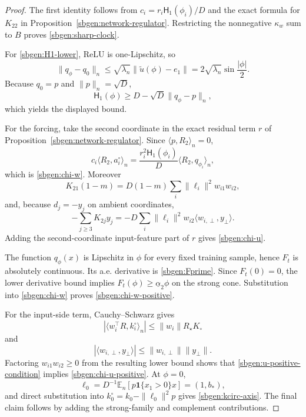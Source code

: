 \documentclass{article} %
\theoremstyle{plain}
\theoremstyle{definition}
\theoremstyle{remark}
\begin{document}
\begin{proof}
The first identity follows from
$c_i=r_i\mathsf H_1(\phi_i)/D$ and the exact formula for $K_{22}$ in
Proposition~\ref{sbgen:network-regulator}.  Restricting the nonnegative
$\kappa_w$ sum to $B$ proves \eqref{sbgen:sharp-clock}.

For \eqref{sbgen:H1-lower}, ReLU is one-Lipschitz, so
\[
\|q_\phi-q_0\|_n
\le
\sqrt{\lambda_n}\|\widetilde u(\phi)-e_1\|
=
2\sqrt{\lambda_n}\sin\frac{|\phi|}{2}.
\]
Because $q_0=p$ and $\|p\|_n=\sqrt D$,
\[
\mathsf H_1(\phi)
\ge
D-\sqrt D\|q_\phi-p\|_n,
\]
which yields the displayed bound.

For the forcing, take the second coordinate in the exact residual term $r$
of Proposition~\ref{sbgen:network-regulator}.  Since
$\langle p,R_2\rangle_n=0$,
\[
c_i\langle R_2,a_i^\circ\rangle_n
=
\frac{r_i^2\mathsf H_1(\phi_i)}D
\langle R_2,q_{\phi_i}\rangle_n,
\]
which is \eqref{sbgen:chi-w}.  Moreover
\[
K_{21}(1-m)
=
D(1-m)\sum_i\|\ell_i\|^2w_{i1}w_{i2},
\]
and, because $d_j=-y_j$ on ambient coordinates,
\[
-\sum_{j\ge3}K_{2j}y_j
=
-D\sum_i\|\ell_i\|^2w_{i2}
\langle w_{i,\perp},y_\perp\rangle.
\]
Adding the second-coordinate input-feature part of $r$ gives
\eqref{sbgen:chi-u}.

The function $q_\phi(x)$ is Lipschitz in $\phi$ for every fixed training
sample, hence $F_t$ is absolutely continuous.  Its a.e. derivative is
\eqref{sbgen:Fprime}.  Since $F_t(0)=0$, the lower derivative bound implies
$F_t(\phi)\ge\underline\alpha_2\phi$ on the strong cone.  Substitution into
\eqref{sbgen:chi-w} proves \eqref{sbgen:chi-w-positive}.

For the input-side term, Cauchy--Schwarz gives
\[
|\langle w_i^\top R,k_i^\circ\rangle_n|
\le
\|w_i\|R_\star K_\circ
\]
and
\[
|\langle w_{i,\perp},y_\perp\rangle|
\le
\|w_{i,\perp}\|\|y_\perp\|.
\]
Factoring $w_{i1}w_{i2}\ge0$ from the resulting lower bound shows that
\eqref{sbgen:u-positive-condition} implies
\eqref{sbgen:chi-u-positive}.  At $\phi=0$,
\[
\ell_0
=
D^{-1}\mathbb E_n[p\mathbf1\{x_1>0\}x]
=(1,b_*),
\]
and direct substitution into
$k_0^\circ=k_0-\|\ell_0\|^2p$ gives
\eqref{sbgen:kcirc-axis}.  The final claim follows by adding the strong-family
and complement contributions.
\end{proof}
\end{document}
